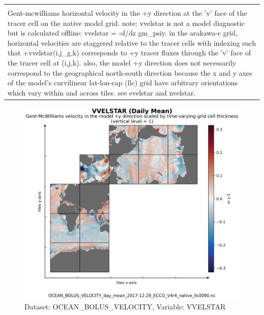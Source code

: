 \begin{longtable}{|m{}|m{}|m{}|m{}|}
{{{{{}}}}} \\ \hline
\rowcolor{lightgray} \multicolumn{4}{|c|}{\textbf{Comments}} \\ \hline
\multicolumn{4}{|p{1\textwidth}|}{\footnotesize{{Gent-mcwilliams horizontal velocity in the +y direction at the 'v' face of the tracer cell on the native model grid. note: vvelstar is not a model diagnostic but is calculated offline: vvelstar = -d/dz gm\_psiy. in the arakawa-c grid, horizontal velocities are staggered relative to the tracer cells with indexing such that +vvelstar(i,j\_g,k) corresponds to +y tracer fluxes through the 'v' face of the tracer cell at (i,j,k). also, the model +y direction does not necessarily correspond to the geographical north-south direction because the x and y axes of the model's curvilinear lat-lon-cap (llc) grid have arbitrary orientations which vary within and across tiles. see evelstar and nvelstar.}}} \\ \hline
\end{longtable}

\begin{figure}[H]
\centering
\includegraphics[scale=0.55]{../images/plots/v4r4/native_plots/Gent-McWilliams_Ocean_Bolus_Velocity/VVELSTAR.png}
\caption{Dataset: OCEAN\_BOLUS\_VELOCITY, Variable: VVELSTAR}
\label{tab:table-OCEAN_BOLUS_VELOCITY_VVELSTAR-Plot}
\end{figure}
\newpage
\pagebreak
